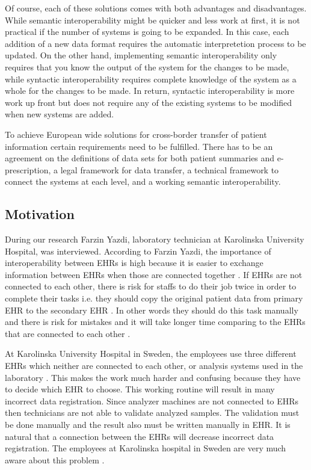 \documentclass[14pt]{article}
\begin{document}
Of course, each of these solutions comes with both advantages and disadvantages.  While semantic interoperability might be quicker and less work at first, it is not practical if the number of systems is going to be expanded. In this case, each addition of a new data format requires the automatic interpretetion process to be updated.  On the other hand, implementing semantic interoperability only requires that you know the output of the system for the changes to be made, while syntactic interoperability requires complete knowledge of the system as a whole for the changes to be made.  In return, syntactic interoperability is more work up front but does not require any of the existing systems to be modified when new systems are added.

To achieve European wide solutions for cross-border transfer of patient information certain requirements need to be fulfilled. There has to be an agreement on the definitions of data sets for both patient summaries and e-prescription, a legal framework for data transfer, a technical framework to connect the systems at each level, and a working semantic \gls{interoperability}. \cite{epSOS1}

\subsection{Motivation}
\label{sec:techMotiv}
During our research Farzin Yazdi, laboratory technician at Karolinska University Hospital, was interviewed. According to Farzin Yazdi\cite{FarzinYazdi}, the importance of interoperability between \glspl{EHR} is high because it is easier to exchange information between \glspl{EHR} when those are connected together \cite{FarzinYazdi}. If \glspl{EHR} are not connected to each other, there is risk for staffs to do their job twice in order to complete their tasks i.e. they should copy the original patient data from primary \gls{EHR} to the secondary \gls{EHR} \cite{FarzinYazdi}. In other words they should do this task manually and there is risk for mistakes and it will take longer time comparing to the \glspl{EHR} that are connected to each other \cite{FarzinYazdi}.

At Karolinska University Hospital in Sweden, the employees use three different \glspl{EHR} which neither are connected to each other, or analysis systems used in the laboratory \cite{FarzinYazdi}. This makes the work much harder and confusing because they have to decide which \gls{EHR} to choose. This working routine will result in many incorrect data registration. Since analyzer machines are not connected to \glspl{EHR} then technicians are not able to validate analyzed samples. The validation must be done manually and the result also must be written manually in \gls{EHR}\cite{FarzinYazdi}.  It is natural that a connection between the \glspl{EHR} will decrease incorrect data registration. The employees at Karolinska hospital in Sweden are very much aware about this problem \cite{FarzinYazdi}.
\end{document}
